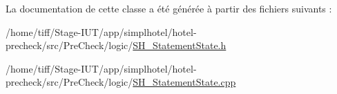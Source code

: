 La documentation de cette classe a été générée à partir des fichiers suivants \-:\begin{DoxyCompactItemize}
\item 
/home/tiff/\-Stage-\/\-I\-U\-T/app/simplhotel/hotel-\/precheck/src/\-Pre\-Check/logic/\hyperlink{SH__StatementState_8h}{S\-H\-\_\-\-Statement\-State.\-h}\item 
/home/tiff/\-Stage-\/\-I\-U\-T/app/simplhotel/hotel-\/precheck/src/\-Pre\-Check/logic/\hyperlink{SH__StatementState_8cpp}{S\-H\-\_\-\-Statement\-State.\-cpp}\end{DoxyCompactItemize}
